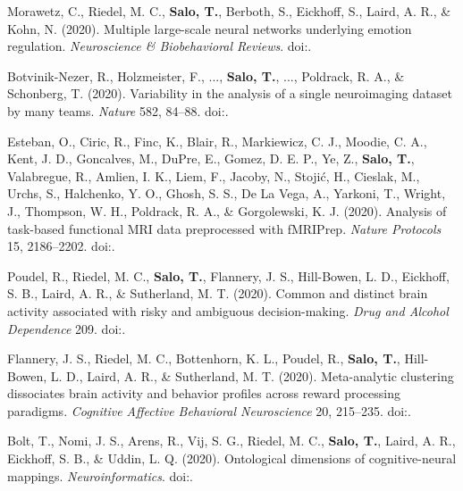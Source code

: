 \documentclass[10pt]{article}
\newcommand{\textlink}[3][blue]{\href{#2}{\color{#1}{#3}}}
\begin{document}
\begin{hangparas}{.25in}{1}
	\bigskip

    Morawetz, C., Riedel, M. C., \textbf{Salo, T.}, Berboth, S.,
    Eickhoff, S., Laird, A. R., \& Kohn, N. (2020).
    Multiple large-scale neural networks underlying emotion regulation.
    \emph{Neuroscience \& Biobehavioral Reviews}.
    doi:\textlink{https://doi.org/10.1016/j.neubiorev.2020.07.001}{10.1016/j.neubiorev.2020.07.001}.

    \bigskip

	Botvinik-Nezer, R., Holzmeister, F., ..., \textbf{Salo, T.}, ...,
	Poldrack, R. A., \& Schonberg, T. (2020).
	Variability in the analysis of a single neuroimaging dataset by many teams.
	\emph{Nature} 582, 84–88.
    doi:\textlink{https://doi.org/10.1038/s41586-020-2314-9}{10.1038/s41586-020-2314-9}.

	\bigskip

	Esteban, O., Ciric, R., Finc, K., Blair, R., Markiewicz, C. J.,
	Moodie, C. A., Kent, J. D., Goncalves, M., DuPre, E., Gomez, D. E. P.,
	Ye, Z., \textbf{Salo, T.}, Valabregue, R., Amlien, I. K., Liem, F.,
	Jacoby, N., Stojić, H., Cieslak, M., Urchs, S., Halchenko, Y. O.,
	Ghosh, S. S., De La Vega, A., Yarkoni, T., Wright, J., Thompson, W. H.,
	Poldrack, R. A., \& Gorgolewski, K. J. (2020).
	Analysis of task-based functional MRI data preprocessed with fMRIPrep.
	\emph{Nature Protocols} 15, 2186–2202.
 	doi:\textlink{https://doi.org/10.1038/s41596-020-0327-3}{10.1038/s41596-020-0327-3}.

	\bigskip

	Poudel, R., Riedel, M. C., \textbf{Salo, T.}, Flannery, J. S., Hill-Bowen, L. D.,
	Eickhoff, S. B., Laird, A. R., \& Sutherland, M. T. (2020).
	Common and distinct brain activity associated with risky and ambiguous decision-making.
	\emph{Drug and Alcohol Dependence} 209.
	doi:\textlink{https://doi.org/10.1016/j.drugalcdep.2020.107884}{10.1016/j.drugalcdep.2020.107884}.

	\bigskip

	Flannery, J. S., Riedel, M. C., Bottenhorn, K. L., Poudel, R.,
	\textbf{Salo, T.}, Hill-Bowen, L. D., Laird, A. R., \& Sutherland, M. T. (2020).
	Meta-analytic clustering dissociates brain activity and behavior profiles across reward processing paradigms.
	\emph{Cognitive Affective Behavioral Neuroscience} 20, 215–235.
	doi:\textlink{https://doi.org/10.3758/s13415-019-00763-7}{10.3758/s13415-019-00763-7}.

	\bigskip

	Bolt, T., Nomi, J. S., Arens, R., Vij, S. G., Riedel, M. C.,
	\textbf{Salo, T.}, Laird, A. R., Eickhoff, S. B., \& Uddin, L. Q. (2020).
	Ontological dimensions of cognitive-neural mappings. \emph{Neuroinformatics}.
	doi:\textlink{https://doi.org/10.1007/s12021-020-09454-y}{10.1007/s12021-020-09454-y}.


\end{hangparas}
\end{document}
